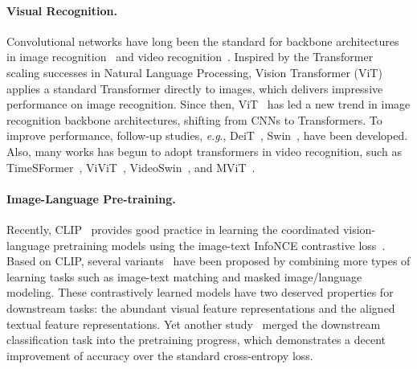 \documentclass[letterpaper]{article} \usepackage{aaai23}  \usepackage{times}  \usepackage{helvet}  \usepackage{courier}  \usepackage[hyphens]{url}  \usepackage{graphicx} \urlstyle{rm} \def\UrlFont{\rm}  \usepackage{natbib}  \usepackage{caption} \frenchspacing  \setlength{\pdfpagewidth}{8.5in}  \setlength{\pdfpageheight}{11in}  \usepackage{algorithm}
\newcommand{\eg}{\textit{e}.\textit{g}.}
\begin{document}
\paragraph{Visual Recognition.} 
Convolutional networks have long been the standard for backbone architectures in image recognition~\cite{alexnet,resnet,vgg,bn} and video recognition~\cite{i3d,p3d,s3d,r2+1d}.
Inspired by the Transformer~\cite{vaswani2017attention} scaling successes in Natural Language Processing, Vision Transformer (ViT)~\cite{ViT} applies a standard Transformer directly to images, which delivers impressive performance on image recognition.
Since then, ViT~\cite{ViT} has led a new trend in image recognition backbone architectures, shifting from CNNs to Transformers.
To improve performance, follow-up studies, \eg, DeiT~\cite{DeiT}, Swin~\cite{liu2021swin}, have been developed.
Also, many works has begun to adopt transformers in video recognition, such as TimeSFormer~\cite{timesformer}, ViViT~\cite{arnab2021vivit}, VideoSwin~\cite{videoswin}, and MViT~\cite{mvit}.


\paragraph{Image-Language Pre-training.}\label{clip}
Recently, CLIP~\cite{CLIP} provides good practice in learning the coordinated vision-language pretraining models using the image-text InfoNCE contrastive loss~\cite{infonce}. 
Based on CLIP, several variants~\cite{ALIGN, li2022blip,yuan2021florence,yu2022coca} have been proposed by combining more types of learning tasks such as image-text matching and masked image/language modeling. These contrastively learned models have two deserved properties for downstream tasks: the abundant visual feature representations and the aligned textual feature representations. Yet another study~\cite{yang2022unified} merged the downstream classification task into the pretraining progress, which demonstrates a decent improvement of accuracy over the standard cross-entropy loss.
\end{document}
